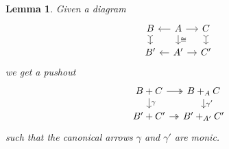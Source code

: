 \documentclass[11pt]{amsart}
\newtheorem{lem}[thm]{Lemma}
\theoremstyle{remark}
\theoremstyle{definition}
\begin{document}
\begin{lem} 
	\label{lem.helpful little lemma}
	Given a diagram
	\begin{equation} 
	\label{diag.helpful little lemma}
	\begin{tikzcd}[column sep=1.0em,row sep=1.0em]
		{B}
			\ar[d,rightarrowtail] &
		{A} 
			\ar[l]
			\ar[d,"\cong"] 
			\ar[r]
			&
		{C} 
			\ar[d,rightarrowtail] \\
		{B'} &
		{A'} 
			\ar[l]
			\ar[r] &
		{C'} 
	\end{tikzcd}
	\end{equation}
	we get a pushout
	\begin{equation}
	\label{diag.helpful pushout}
	\begin{tikzcd}[column sep=1.0em,row sep=1.0em]
		{B+C} 
			\ar[r,twoheadrightarrow] 
			\ar[d,"\gamma"] &
		{B+_AC} 
			\ar[d,"\gamma'"] \\
		{B'+C'} 
			\ar[r,twoheadrightarrow] &
		{B'+_{A'}C'}
	\end{tikzcd}
	\end{equation}
	such that the canonical arrows $\gamma$ 
	and $\gamma'$ are monic.
\end{lem}
\end{document}
